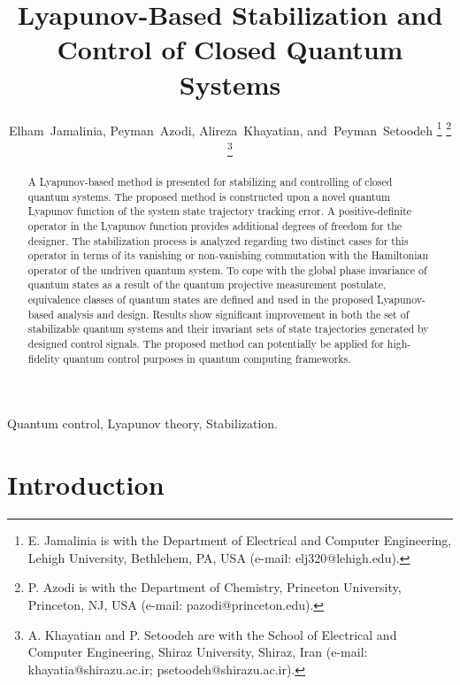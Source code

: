 \documentclass[journal]{IEEEtran}
\theoremstyle{definition}
\begin{document}
\title{Lyapunov-Based Stabilization and Control of Closed Quantum Systems}

\author{Elham~Jamalinia,  
             Peyman~Azodi,  
             Alireza~Khayatian, 
        and~Peyman~Setoodeh
\thanks{E. Jamalinia is with the Department of Electrical and Computer Engineering, Lehigh University, Bethlehem, PA, USA (e-mail: elj320@lehigh.edu).}
\thanks{P. Azodi is with the Department of Chemistry, Princeton University, Princeton, NJ, USA (e-mail: pazodi@princeton.edu).}
\thanks{A. Khayatian and P. Setoodeh are with the School of Electrical and Computer Engineering, Shiraz University, Shiraz, Iran (e-mail: khayatia@shirazu.ac.ir; psetoodeh@shirazu.ac.ir).}
}


\maketitle

\begin{abstract}
A Lyapunov-based method is presented for stabilizing and controlling of closed quantum systems. The proposed method is constructed upon a novel quantum Lyapunov function of the system state trajectory tracking error. A positive-definite operator in the Lyapunov function provides additional degrees of freedom for the designer. The stabilization process is analyzed regarding two distinct cases for this operator in terms of its vanishing or non-vanishing commutation with the Hamiltonian operator of the undriven quantum system. To cope with the global phase invariance of quantum states as a result of the quantum projective measurement postulate, equivalence classes of quantum states are defined and used in the proposed Lyapunov-based analysis and design. Results show significant improvement in both the set of stabilizable quantum systems and their invariant sets of state trajectories generated by designed control signals. The proposed method can potentially be applied for high-fidelity quantum control purposes in quantum computing frameworks. 
\end{abstract}

\begin{IEEEkeywords}
Quantum control, Lyapunov theory, Stabilization.
\end{IEEEkeywords}



\section{Introduction}
\label{sec:introduction}
\end{document}
